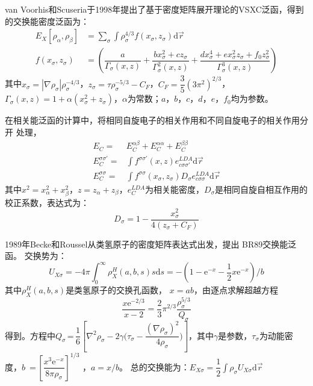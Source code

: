van Voorhis和Scuseria于1998年提出了基于密度矩阵展开理论\cite{PRC5-1472_1972,PRC11-1030_1975}的VSXC泛\linebreak 函\cite{JCP109-400_1998}，得到的交换能密度泛函为：
\begin{equation}
  \begin{aligned}
    E_X[\rho_{\alpha},\rho_{\beta}]&=\sum_{\sigma}\int\rho_{\sigma}^{4/3}{f(x_{\sigma},z_{\sigma})
    }\textrm{d}\vec r\\
    f(x_{\sigma},z_{\sigma})&=\left(\dfrac a{\Gamma_{\sigma}(x,z)}+\dfrac{bx_{\sigma}^2+cz_{\sigma}}{\Gamma_{\sigma}^2(x,z)}+\dfrac{dx_{\sigma}^4+ex_{\sigma}^2z_{\sigma}+f_0z_{\sigma}^2}{\Gamma_{\sigma}^3(x,z)}\right) 
  \end{aligned}
  \label{ed:def-22}
\end{equation}
其中$x_{\sigma}=|\nabla\rho_{\sigma}|\rho_{\sigma}^{-4/3}$，$z_{\sigma}=\tau\rho_{\sigma}^{-5/3}-C_F$，$C_F=\dfrac35(3\pi^2)^{2/3}$，$\Gamma_{\sigma}(x,z)=1+\alpha(x_{\sigma}^2+z_{\sigma})$，\linebreak $\alpha$为常数；$a$，$b$，$c$，$d$，$e$，$f_0$均为参数。

{在}相关能泛函的计算中，将相同自旋电子的相关作用和不同自旋{电子}的相关作用分开%
{处理}\cite{TCA49-143_1978}，%
\begin{equation}
  \begin{aligned}
    E_C=&E_C^{\alpha\beta}+E_C^{\alpha\alpha}+E_C^{\beta\beta}\\
    E_C^{\sigma\sigma'}=&\int f^{\sigma\sigma'}(x,z)e_{c\sigma\sigma'}^{LDA}\textrm{d}\vec r\\
    E_C^{\sigma\sigma}=&\int f^{\sigma\sigma}(x_{\sigma},z_{\sigma})
    D_{\sigma}e_{c\sigma\sigma}^{LDA}\textrm{d}\vec r
  \end{aligned}
  \label{eq:dft-23}
\end{equation}
其中$x^2=x_{\alpha}^2+x_{\beta}^2$，$z=z_{\alpha}+z_{\beta}$，{$e_C^{LDA}$为相关能密度，}$D_{\sigma}$是相同自旋自相互作用的校正系数，表达式为：
$$D_{\sigma}=1-\dfrac{x_{\sigma}^2}{4(z_{\sigma}+C_F)}$$

1989年Becke和Roussel从类氢原子的密度矩阵表达式出发，提出%
BR89交换能泛\linebreak 函\cite{PRA39-3761_1989}。
交换势为：
$$U_{X\sigma}=-4\pi\int_0^{\infty}\rho_X^H(a,b,s)s\textrm{d}s=-\left(1-\textrm{e}^{-x}-\frac12x\textrm{e}^{-x}\right)/b$$
其中$\rho_X^H(a,b,s)$是类氢原子的交换孔函数，%
{$x=ab$}，由{逐点求解}超越方程
$$\dfrac{x\textrm{e}^{-2/3}}{x-2}=\dfrac23\pi^{2/3}\dfrac{\rho_{\sigma}^{5/3}}{Q_{\sigma}}$$
得到。方程中$Q_{\sigma}$\,=\,$\dfrac16\left[\nabla^2\rho_{\sigma}-2\gamma\bigl(\tau_{\sigma}-\dfrac{(\nabla\rho_{\sigma})^2}{4\rho_{\sigma}}\bigr)\right]$，其中$\gamma$是参数，$\tau_{\sigma}$为动能密度{，}\linebreak $b$%
\,=\,$\left[\dfrac{x^3\textrm{e}^{-x}}{8\pi\rho_{\sigma}}\right]^{1/3}$%
{，$a=x/b$。}%
总的交换能为：$E_{X\sigma}=\dfrac12\displaystyle\int\rho_{\sigma}U_{X\sigma}\textrm{d}\vec r$

